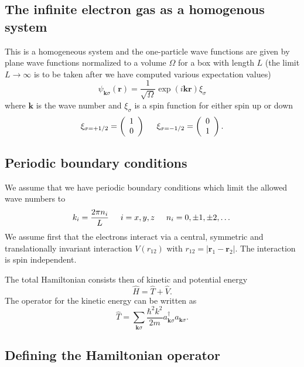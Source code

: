 \subsection{The infinite electron gas as a homogenous system}

This is a homogeneous system and the one-particle wave functions are given by plane wave functions normalized to a volume $\Omega$ 
for a box with length $L$ (the limit $L\rightarrow \infty$ is to be taken after we have computed various expectation values)
\[
\psi_{\mathbf{k}\sigma}(\mathbf{r})= \frac{1}{\sqrt{\Omega}}\exp{(i\mathbf{kr})}\xi_{\sigma}
\]
where $\mathbf{k}$ is the wave number and  $\xi_{\sigma}$ is a spin function for either spin up or down
\[ 
\xi_{\sigma=+1/2}=\left(\begin{array}{c} 1 \\ 0 \end{array}\right) \hspace{0.5cm}
\xi_{\sigma=-1/2}=\left(\begin{array}{c} 0 \\ 1 \end{array}\right).
\]




\subsection{Periodic boundary conditions}


We assume that we have periodic boundary conditions which limit the allowed wave numbers to
\[
k_i=\frac{2\pi n_i}{L}\hspace{0.5cm} i=x,y,z \hspace{0.5cm} n_i=0,\pm 1,\pm 2, \dots
\]
We assume first that the electrons interact via a central, symmetric and translationally invariant
interaction  $V(r_{12})$ with
$r_{12}=|\mathbf{r}_1-\mathbf{r}_2|$.  The interaction is spin independent.

The total Hamiltonian consists then of kinetic and potential energy
\[
\hat{H} = \hat{T}+\hat{V}.
\]
The operator for the kinetic energy can be written as
\[
\hat{T}=\sum_{\mathbf{k}\sigma}\frac{\hbar^2k^2}{2m}a_{\mathbf{k}\sigma}^{\dagger}a_{\mathbf{k}\sigma}.
\]



\subsection{Defining the Hamiltonian operator}

